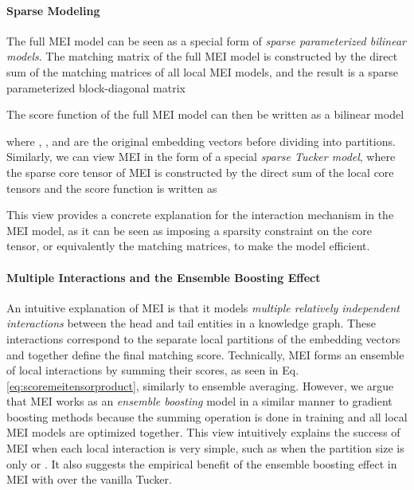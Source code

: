 \documentclass{ecai}
\theoremstyle{plain}  \newtheorem{thm}{Theorem}  \newtheorem{lem}[thm]{Lemma}  \newtheorem{prop}[thm]{Proposition}
\theoremstyle{remark}  \newtheorem*{rem}{Remark}
\begin{document}
\paragraph{Sparse Modeling}
The full MEI model can be seen as a special form of \textit{sparse parameterized bilinear models}. The matching matrix of the full MEI model is constructed by the direct sum of the matching matrices of all local MEI models, and the result is a sparse parameterized block-diagonal matrix 

The score function of the full MEI model can then be written as a bilinear model

where , , and  are the original embedding vectors before dividing into  partitions. Similarly, we can view MEI in the form of a special \textit{sparse Tucker model}, where the sparse core tensor  of MEI is constructed by the direct sum of the  local core tensors  and the score function is written as

This view provides a concrete explanation for the interaction mechanism in the MEI model, as it can be seen as imposing a sparsity constraint on the core tensor, or equivalently the matching matrices, to make the model efficient.



\paragraph{Multiple Interactions and the Ensemble Boosting Effect}
An intuitive explanation of MEI is that it models \textit{multiple relatively independent interactions} between the head and tail entities in a knowledge graph. These interactions correspond to the separate local partitions of the embedding vectors and together define the final matching score. Technically, MEI forms an ensemble of  local interactions by summing their scores, as seen in Eq. \ref{eq:scoremeitensorproduct}, similarly to ensemble averaging. However, we argue that MEI works as an \textit{ensemble boosting} model in a similar manner to gradient boosting methods because the summing operation is done in training and all local MEI models are optimized together. This view intuitively explains the success of MEI when each local interaction is very simple, such as when the partition size is only  or . It also suggests the empirical benefit of the ensemble boosting effect in MEI with  over the vanilla Tucker.
\end{document}
